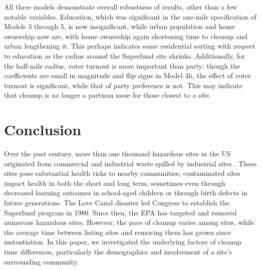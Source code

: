 \documentclass[12pt]{article}
\begin{document}
{All three models demonstrate overall robustness of results, other than a few notable variables. Education, which was significant in the one-mile specification of Models 3 through 5, is now insignificant, while urban population and home ownership now are, with home ownership again shortening time to cleanup and urban lengthening it. This perhaps indicates some residential sorting with respect to education as the radius around the Superfund site shrinks. Additionally, for the half-mile radius, voter turnout is more important than party: though the coefficients are small in magnitude and flip signs in Model 4h, the effect of voter turnout is significant, while that of party preference is not. This may indicate that cleanup is no longer a partisan issue for those closest to a site.

\section{Conclusion}\label{conc}

Over the past century, more than one thousand hazardous sites in the US originated from commercial and industrial waste spilled by industrial sites \parencite{EPA2011}. These sites pose substantial health risks to nearby communities; contaminated sites impact health in both the short and long term, sometimes even through decreased learning outcomes in school-aged children \parencite{Pastor2004} or through birth defects in future generations. The Love Canal disaster led Congress to establish the Superfund program in 1980. Since then, the EPA has targeted and removed numerous hazardous sites. However, the pace of cleanup varies among sites, while the average time between listing sites and removing them has grown since instantiation. In this paper, we investigated the underlying factors of cleanup time differences, particularly the demographics and involvement of a site's surrounding community. 

}
\end{document}
